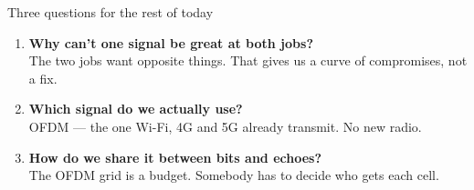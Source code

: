 \begin{frame}{Three questions for the rest of today}
  \vspace{0.8em}
  \begin{enumerate}\itemsep16pt
    \item {\large\textbf{Why can't one signal be great at both jobs?}}\\
      {\small The two jobs want opposite things. That gives us a curve of
       compromises, not a fix.}
    \item {\large\textbf{Which signal do we actually use?}}\\
      {\small OFDM --- the one Wi-Fi, 4G and 5G already transmit. No new radio.}
    \item {\large\textbf{How do we share it between bits and echoes?}}\\
      {\small The OFDM grid is a budget. Somebody has to decide who gets each cell.}
  \end{enumerate}

  \vspace{1.0em}
\end{frame}
